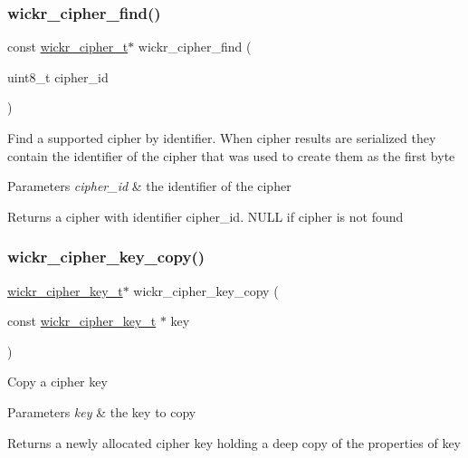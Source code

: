 \subsubsection{\texorpdfstring{wickr\+\_\+cipher\+\_\+find()}{wickr\_cipher\_find()}}
{\footnotesize\ttfamily const \mbox{\hyperlink{structwickr__cipher}{wickr\+\_\+cipher\+\_\+t}}$\ast$ wickr\+\_\+cipher\+\_\+find (\begin{DoxyParamCaption}\item[{uint8\+\_\+t}]{cipher\+\_\+id }\end{DoxyParamCaption})}

Find a supported cipher by identifier. When cipher results are serialized they contain the identifier of the cipher that was used to create them as the first byte


\begin{DoxyParams}{Parameters}
{\em cipher\+\_\+id} & the identifier of the cipher \\
\hline
\end{DoxyParams}
\begin{DoxyReturn}{Returns}
a cipher with identifier \textquotesingle{}cipher\+\_\+id\textquotesingle{}. N\+U\+LL if cipher is not found 
\end{DoxyReturn}
\mbox{\label{group__wickr__cipher_gaa473bc83f82d6353aa6f4cb4e36bf4f0}} 
\subsubsection{\texorpdfstring{wickr\+\_\+cipher\+\_\+key\+\_\+copy()}{wickr\_cipher\_key\_copy()}}
{\footnotesize\ttfamily \mbox{\hyperlink{structwickr__cipher__key}{wickr\+\_\+cipher\+\_\+key\+\_\+t}}$\ast$ wickr\+\_\+cipher\+\_\+key\+\_\+copy (\begin{DoxyParamCaption}\item[{const \mbox{\hyperlink{structwickr__cipher__key}{wickr\+\_\+cipher\+\_\+key\+\_\+t}} $\ast$}]{key }\end{DoxyParamCaption})}

Copy a cipher key


\begin{DoxyParams}{Parameters}
{\em key} & the key to copy \\
\hline
\end{DoxyParams}
\begin{DoxyReturn}{Returns}
a newly allocated cipher key holding a deep copy of the properties of \textquotesingle{}key\textquotesingle{} 
\end{DoxyReturn}
\mbox{\label{group__wickr__cipher_ga73e2a916ba0ff19517e30a65a68390f0}} 
